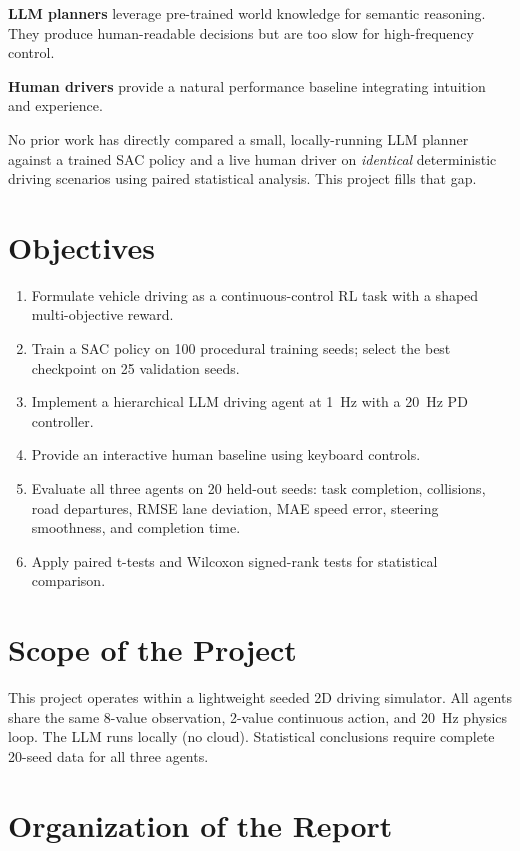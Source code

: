 \documentclass[12pt,a4paper]{report}
\begin{document}
\textbf{LLM planners} leverage pre-trained world knowledge for semantic reasoning. They produce human-readable decisions but are too slow for high-frequency control.

\textbf{Human drivers} provide a natural performance baseline integrating intuition and experience.

No prior work has directly compared a small, locally-running LLM planner against a trained SAC policy and a live human driver on \textit{identical} deterministic driving scenarios using paired statistical analysis. This project fills that gap.

\section{Objectives}

\begin{enumerate}
  \item Formulate vehicle driving as a continuous-control RL task with a shaped multi-objective reward.
  \item Train a SAC policy on 100 procedural training seeds; select the best checkpoint on 25 validation seeds.
  \item Implement a hierarchical LLM driving agent at 1~Hz with a 20~Hz PD controller.
  \item Provide an interactive human baseline using keyboard controls.
  \item Evaluate all three agents on 20 held-out seeds: task completion, collisions, road departures, RMSE lane deviation, MAE speed error, steering smoothness, and completion time.
  \item Apply paired t-tests and Wilcoxon signed-rank tests for statistical comparison.
\end{enumerate}

\section{Scope of the Project}

This project operates within a lightweight seeded 2D driving simulator. All agents share the same 8-value observation, 2-value continuous action, and 20~Hz physics loop. The LLM runs locally (no cloud). Statistical conclusions require complete 20-seed data for all three agents.

\section{Organization of the Report}
\end{document}
